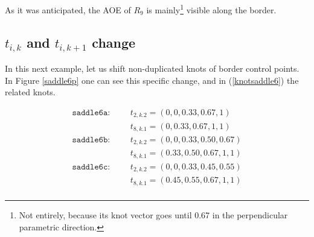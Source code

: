 \documentclass{article}
\begin{document}
As it was anticipated, the AOE of $R_9$ is mainly\footnote{Not entirely, because its knot vector goes until 0.67 in the perpendicular parametric direction.} visible along the border.

\subsection{$t_{i, k}$ and $t_{i, k+1}$ change}

\vspace{6pt}

In this next example, let us shift non-duplicated knots of border control points. In Figure \ref{saddle6p} one can see this specific change, and in (\ref{knotsaddle6}) the related knots.

\begin{equation}
\begin{split}
\texttt{saddle6a}: \phantom{ww} & t_{2, k. 2} = (0, 0, 0.33, 0.67, 1) \\
& t_{8, k. 1} = (0, 0.33, 0.67, 1, 1) \\
\texttt{saddle6b}: \phantom{ww} & t_{2, k. 2} = (0, 0, 0.33, 0.50, 0.67) \\
& t_{8, k. 1} = (0.33, 0.50, 0.67, 1, 1) \\
\texttt{saddle6c}: \phantom{ww} & t_{2, k. 2} = (0, 0, 0.33, 0.45, 0.55) \\
& t_{8, k. 1} = (0.45, 0.55, 0.67, 1, 1) \\
\end{split}
\label{knotsaddle6}
\end{equation}
\end{document}

